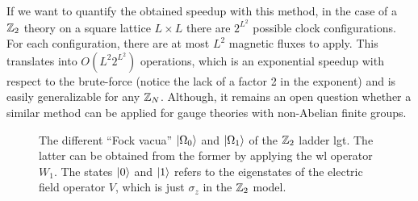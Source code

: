 If we want to quantify the obtained speedup with this method, in the case of a $\Z_2$ theory on a square lattice $L \times L$ there are $2^{L^2}$ possible clock configurations.
For each configuration, there are at most $L^2$ magnetic fluxes to apply.
This translates into $O(L^2 2^{L^2})$ operations, which is an exponential speedup with respect to the brute-force (notice the lack of a factor 2 in the exponent) and is easily generalizable for any $\mathbb{Z}_N$.
Although, it remains an open question whether a similar method can be applied for gauge theories with non-Abelian finite groups.

\begin{figure}[t]
    \centering
    
    \caption[Vacuum states of the super-selection sectors of the $\Z_2$ ladder \ac{lgt}]{%
        The different ``Fock vacua'' $\ket{\Omega_{0}}$ and $\ket{\Omega_{1}}$ of the $\Z_2$ ladder \ac{lgt}.
        The latter can be obtained from the former by applying the \ac{wl} operator $W_1$.
        The states $\ket{0}$ and $\ket{1}$ refers to the eigenstates of the electric field operator $V$, which is just $\sigma_{z}$ in the $\Z_2$ model.
    }
    \label{fig:z2_vacua}
\end{figure}
